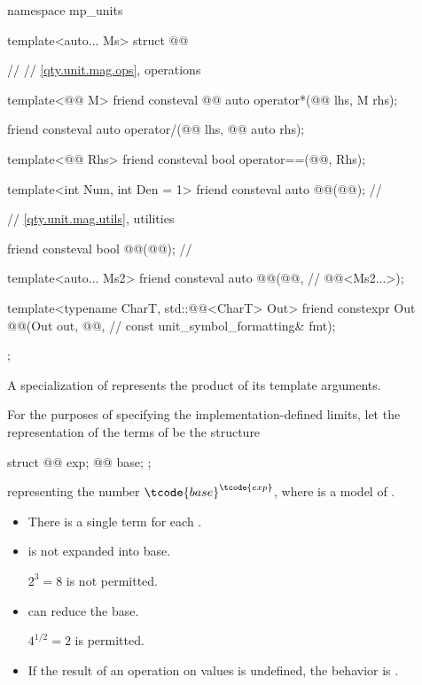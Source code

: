 \begin{codeblock}
namespace mp_units {

template<auto... Ms>
struct @@ {  // \expos
  // \ref{qty.unit.mag.ops}, operations

  template<@@ M>
  friend consteval @@ auto operator*(@@ lhs, M rhs);

  friend consteval auto operator/(@@ lhs, @@ auto rhs);

  template<@@ Rhs>
  friend consteval bool operator==(@@, Rhs);

  template<int Num, int Den = 1>
  friend consteval auto @@(@@);                         // \expos

  // \ref{qty.unit.mag.utils}, utilities

  friend consteval bool @@(@@);  // \expos

  template<auto... Ms2>
  friend consteval auto @@(@@,             // \expos
                                         @@<Ms2...>);

  template<typename CharT, std::@@<CharT> Out>
  friend constexpr Out @@(Out out, @@,     // \expos
                                        const unit_symbol_formatting& fmt);
};

}
\end{codeblock}

\pnum
A specialization of 
represents the product of its template arguments.

\pnum
For the purposes of specifying the implementation-defined limits,
let the representation of the terms of  be the structure
\begin{codeblock}
struct {
  @@ exp;
  @@ base;
};
\end{codeblock}
representing the number $\tcode{base}^\tcode{exp}$,
where  is a model of .
\begin{itemize}
\item
There is a single term for each .
\item
{} is not expanded into base.
\begin{note}
$2^3 = 8$ is not permitted.
\end{note}
\item
{} can reduce the base.
\begin{note}
$4^{1/2} = 2$ is permitted.
\end{note}
\item
If the result of an operation on  values is undefined,
the behavior is
.
\end{itemize}

